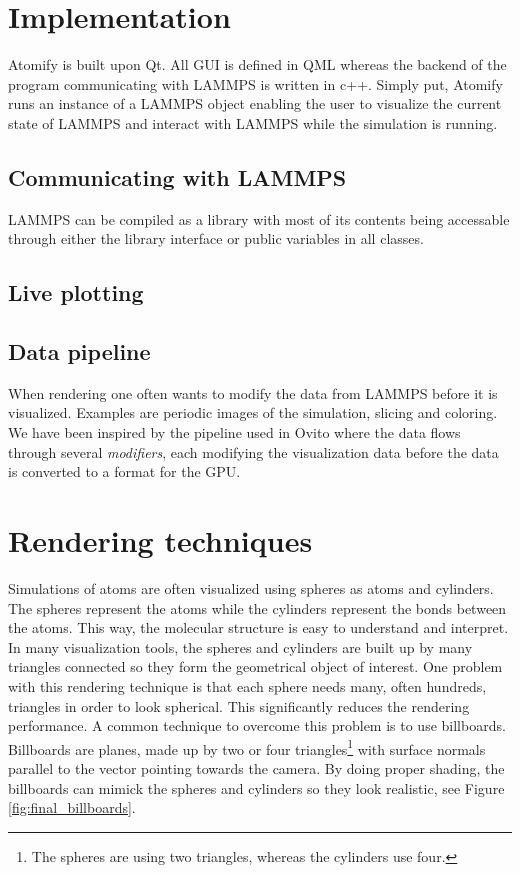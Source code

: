 \documentclass[aps,pre,twocolumn,letterpaper,floatfix]{revtex4}
\begin{document}
\section{Implementation}
Atomify is built upon Qt. All GUI is defined in QML whereas the backend of the program communicating with LAMMPS is written in c++. Simply put, Atomify runs an instance of a LAMMPS object enabling the user to visualize the current state of LAMMPS and interact with LAMMPS while the simulation is running. 

\subsection{Communicating with LAMMPS}
LAMMPS can be compiled as a library with most of its contents being accessable through either the library interface or public variables in all classes. 

\subsection{Live plotting}

\subsection{Data pipeline}
When rendering one often wants to modify the data from LAMMPS before it is visualized. Examples are periodic images of the simulation, slicing and coloring. We have been inspired by the pipeline used in Ovito where the data flows through several \textit{modifiers}, each modifying the visualization data before the data is converted to a format for the GPU.

\section{Rendering techniques}
Simulations of atoms are often visualized using spheres as atoms and cylinders. The spheres represent the atoms while the cylinders represent the bonds between the atoms. This way, the molecular structure is easy to understand and interpret. In many visualization tools, the spheres and cylinders are built up by many triangles connected so they form the geometrical object of interest. One problem with this rendering technique is that each sphere needs many, often hundreds, triangles in order to look spherical. This significantly reduces the rendering performance. A common technique to overcome this problem is to use billboards. Billboards are planes, made up by two or four triangles\footnote{The spheres are using two triangles, whereas the cylinders use four.} with surface normals parallel to the vector pointing towards the camera. By doing proper shading, the billboards can mimick the spheres and cylinders so they look realistic, see Figure \ref{fig:final_billboards}.
\end{document}
